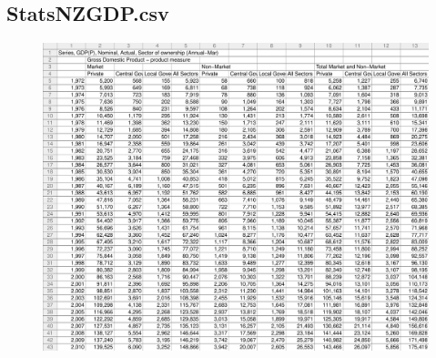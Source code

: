 \documentclass[a4paper]{article}
\begin{document}
\subsection{StatsNZGDP.csv}
\label{sec:TCRO_StatsNZGDP.csv}
\begin{figure}[!h]
\centering
\includegraphics[width=\textwidth]{./TestCase/StatsNZGDP.pdf}
\end{figure}
\end{document}

